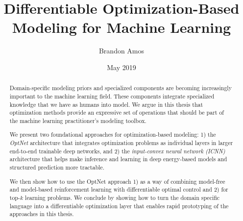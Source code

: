 \documentclass[12pt]{cmuthesis}
\begin{document}
\frontmatter

\pagestyle{empty}

\title{{\bf Differentiable Optimization-Based Modeling for Machine Learning}}
\author{Brandon Amos}
\date{May 2019}


\support{
}
\disclaimer{}


\maketitle


\begin{abstract}
  Domain-specific modeling priors and specialized components are
  becoming increasingly important to the machine learning field.
  These components integrate specialized knowledge that we have
  as humans into model.
  We argue in this thesis that optimization methods provide an
  expressive set of operations that should be part of the
  machine learning practitioner's modeling toolbox.

  We present two foundational approaches for optimization-based modeling:
  1) the \emph{OptNet} architecture that integrates
  optimization problems as individual layers in larger end-to-end
  trainable deep networks, and
  2) the \emph{input-convex neural network (ICNN)}
  architecture that helps make inference and learning in deep
  energy-based models and structured prediction more tractable.

  We then show how to use the OptNet approach
  1) as a way of combining model-free and model-based reinforcement
  learning with differentiable optimal control and
  2) for top-$k$ learning problems.
  We conclude by showing how to turn the \cvxpy domain
  specific language into a differentiable optimization layer
  that enables rapid prototyping of the approaches
  in this thesis.
\end{abstract}
\end{document}
